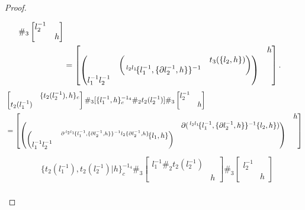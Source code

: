 \documentclass[11pt, reqno]{amsart} %
\newcommand{\act}[1]{\,\sp{#1}\!}
\theoremstyle{definition}
\theoremstyle{remark}
\numberwithin{equation}{section}
\begin{document}
\begin{proof}
\begin{enumerate}
\begin{align}
    \#_3
    \begin{bmatrix}l_2^{-1} & \\ & h\end{bmatrix} \\
    \label{eq:piece3}
    &= 
    \begin{bmatrix} & h \\ \begin{pmatrix} & \begin{pmatrix} & t_3(\{l_2,h\}) \\ \act{l_2l_1}\{l_1^{-1},\{\partial l_2^{-1},h\}\}^{-1} &\end{pmatrix} \\ l_1^{-1}l_2^{-1} &\end{pmatrix} & \end{bmatrix}.
  \end{align}
  \begin{align}
    \nonumber
    &
    \begin{bmatrix} & \{t_2(l_2^{-1}),h\}_c \\ t_2(l_1^{-1}) & \end{bmatrix}
    \#_3
    [\{l_1^{-1},h\}_c^{-1_4}\#_2t_2(l_2^{-1})]
    \#_3
    \begin{bmatrix}l_2^{-1} & \\ & h\end{bmatrix} \\
    \label{eq:piece4}
    &= 
    \begin{bmatrix} & h \\ \begin{pmatrix} & \partial(\act{l_2l_1}\{l_1^{-1},\{\partial l_2^{-1},h\}\}^{-1}\{l_2,h\}) \\ \begin{pmatrix} & \act{\partial\act{l_2l_1}\{l_1^{-1},\{\partial l_2^{-1},h\}\}^{-1}l_2\{\partial l_2^{-1},h\}}\{l_1,h\}\\ l_1^{-1}l_2^{-1} & \end{pmatrix} &\end{pmatrix} & \end{bmatrix}
  \end{align}
  \begin{align}
    &\nonumber
    \{t_2(l_1^{-1}),t_2(l_2^{-1})|h\}_c^{-1_4}
    \#_3
    \begin{bmatrix}l_1^{-1}\#_2t_2(l_2^{-1}) & \\ & h\end{bmatrix} 
    \#_3
    \begin{bmatrix}l_2^{-1} & \\ & h\end{bmatrix} \\

\end{align}
\end{enumerate}
\end{proof}
\end{document}
